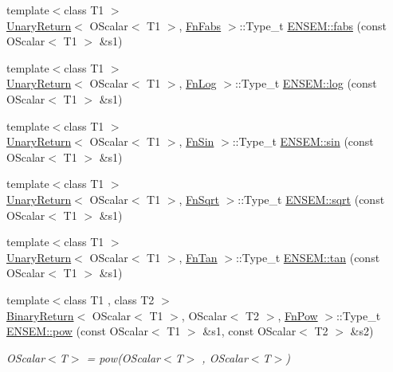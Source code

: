\begin{DoxyCompactItemize}
\item 
{\footnotesize template$<$class T1 $>$ }\\\mbox{\hyperlink{structUnaryReturn}{Unary\+Return}}$<$ O\+Scalar$<$ T1 $>$, \mbox{\hyperlink{structFnFabs}{Fn\+Fabs}} $>$\+::Type\+\_\+t \mbox{\hyperlink{group__obsscalar_gaab3ff43b1817abbbfb1caf2c90110a0f}{E\+N\+S\+E\+M\+::fabs}} (const O\+Scalar$<$ T1 $>$ \&s1)
\item 
{\footnotesize template$<$class T1 $>$ }\\\mbox{\hyperlink{structUnaryReturn}{Unary\+Return}}$<$ O\+Scalar$<$ T1 $>$, \mbox{\hyperlink{structFnLog}{Fn\+Log}} $>$\+::Type\+\_\+t \mbox{\hyperlink{group__obsscalar_gac3f245df6eb6b0c94e6aa959b1e7676c}{E\+N\+S\+E\+M\+::log}} (const O\+Scalar$<$ T1 $>$ \&s1)
\item 
{\footnotesize template$<$class T1 $>$ }\\\mbox{\hyperlink{structUnaryReturn}{Unary\+Return}}$<$ O\+Scalar$<$ T1 $>$, \mbox{\hyperlink{structFnSin}{Fn\+Sin}} $>$\+::Type\+\_\+t \mbox{\hyperlink{group__obsscalar_ga2f881a4ba6a085af64243caa93001f49}{E\+N\+S\+E\+M\+::sin}} (const O\+Scalar$<$ T1 $>$ \&s1)
\item 
{\footnotesize template$<$class T1 $>$ }\\\mbox{\hyperlink{structUnaryReturn}{Unary\+Return}}$<$ O\+Scalar$<$ T1 $>$, \mbox{\hyperlink{structFnSqrt}{Fn\+Sqrt}} $>$\+::Type\+\_\+t \mbox{\hyperlink{group__obsscalar_ga8b8e13d0f31d513ae7c36827f65c0c61}{E\+N\+S\+E\+M\+::sqrt}} (const O\+Scalar$<$ T1 $>$ \&s1)
\item 
{\footnotesize template$<$class T1 $>$ }\\\mbox{\hyperlink{structUnaryReturn}{Unary\+Return}}$<$ O\+Scalar$<$ T1 $>$, \mbox{\hyperlink{structFnTan}{Fn\+Tan}} $>$\+::Type\+\_\+t \mbox{\hyperlink{group__obsscalar_ga9d270814e58292523d977713c693c876}{E\+N\+S\+E\+M\+::tan}} (const O\+Scalar$<$ T1 $>$ \&s1)
\item 
{\footnotesize template$<$class T1 , class T2 $>$ }\\\mbox{\hyperlink{structBinaryReturn}{Binary\+Return}}$<$ O\+Scalar$<$ T1 $>$, O\+Scalar$<$ T2 $>$, \mbox{\hyperlink{structFnPow}{Fn\+Pow}} $>$\+::Type\+\_\+t \mbox{\hyperlink{group__obsscalar_ga9cb05cc2982ed462255669689f38c8cd}{E\+N\+S\+E\+M\+::pow}} (const O\+Scalar$<$ T1 $>$ \&s1, const O\+Scalar$<$ T2 $>$ \&s2)
\begin{DoxyCompactList}\small\item\em O\+Scalar$<$\+T$>$ = pow(\+O\+Scalar$<$\+T$>$ , O\+Scalar$<$\+T$>$) \end{DoxyCompactList}\item 

\end{DoxyCompactItemize}
